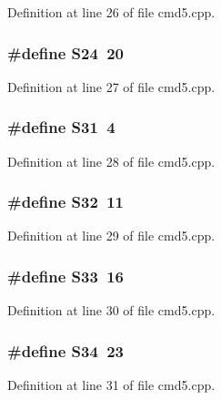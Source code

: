 Definition at line 26 of file cmd5.\-cpp.

\subsubsection[{S24}]{\setlength{\rightskip}{0pt plus 5cm}\#define S24~20}\label{cmd5_8cpp_a0c09eb77d30a0d5f9154914147b86c20}


Definition at line 27 of file cmd5.\-cpp.

\subsubsection[{S31}]{\setlength{\rightskip}{0pt plus 5cm}\#define S31~4}\label{cmd5_8cpp_aef26590f8a880ee6f4a158168defcd89}


Definition at line 28 of file cmd5.\-cpp.

\subsubsection[{S32}]{\setlength{\rightskip}{0pt plus 5cm}\#define S32~11}\label{cmd5_8cpp_a1d512424dd8a91e0a5bcc98563f33914}


Definition at line 29 of file cmd5.\-cpp.

\subsubsection[{S33}]{\setlength{\rightskip}{0pt plus 5cm}\#define S33~16}\label{cmd5_8cpp_a1c854214533f6220e859b0063196abb3}


Definition at line 30 of file cmd5.\-cpp.

\subsubsection[{S34}]{\setlength{\rightskip}{0pt plus 5cm}\#define S34~23}\label{cmd5_8cpp_af6472be1d535970afee8e5266a74aa07}


Definition at line 31 of file cmd5.\-cpp.

